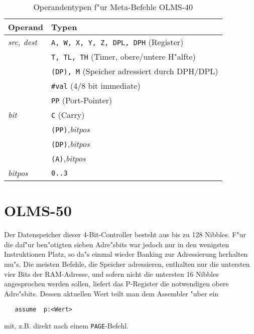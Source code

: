 \documentclass[12pt,a4paper,twoside]{report}
\newcommand{\tty}[1]{{\tt #1}}
\begin{document}
\begin{table*}
\begin{center}\begin{tabular}{|l|l|}
\hline
Operand                 & Typen \\
\hline
{\em src, dest}         & \tty{A, W, X, Y, Z, DPL, DPH} (Register) \\
                        & \tty{T, TL, TH} (Timer, obere/untere H"alfte) \\
                        & \tty{(DP), M} (Speicher adressiert durch DPH/DPL) \\
                        & \tty{\#val} (4/8 bit immediate) \\
                        & \tty{PP} (Port-Pointer) \\
{\em bit}               & \tty{C} (Carry) \\
                        & \tty{(PP)},{\em bitpos} \\
                        & \tty{(DP)},{\em bitpos} \\
                        & \tty{(A)},{\em bitpos} \\
{\em bitpos}            & \tty{0..3} \\
\hline
\end{tabular}\end{center}
\caption{Operandentypen f"ur Meta-Befehle OLMS-40}
\label{TabOLMS40MetaOps}
\end{table*}


\section{OLMS-50}

Der Datenspeicher dieser 4-Bit-Controller besteht aus bis zu 128
Nibbles.  F"ur die daf"ur ben"otigten sieben Adre"sbits war
jedoch nur in den wenigsten Instruktionen Platz, so da"s einmal
wieder Banking zur Adressierung herhalten mu"s.  Die meisten
Befehle, die Speicher adressieren, enthalten nur die untersten
vier Bits der RAM-Adresse, und sofern nicht die untersten 16
Nibbles angesprochen werden sollen, liefert das P-Register die
notwendigen obere Adre"sbits.  Dessen aktuellen Wert teilt man
dem Assembler "uber ein
\begin{verbatim}
   assume  p:<Wert>
\end{verbatim}
mit, z.B. direkt nach einem \tty{PAGE}-Befehl.
\end{document}
